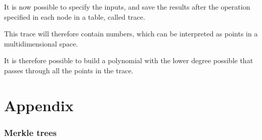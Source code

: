 \documentclass[12pt]{article}
\begin{document}
It is now possible to specify the inputs, and save the results after the operation specified in each node in a table, called trace.

This trace will therefore contain numbers, which can be interpreted as points in a multidimensional space.

It is therefore possible to build a polynomial with the lower degree possible that passes through all the points in the trace.

\paragraph{}


\part{Appendix} \label{part:appendix}
\section{Merkle trees} \label{section:merkle_trees}
\cite{ethereum_merkle_trees} \cite{ethereum_merkle_proof}

\newpage


\end{document}
